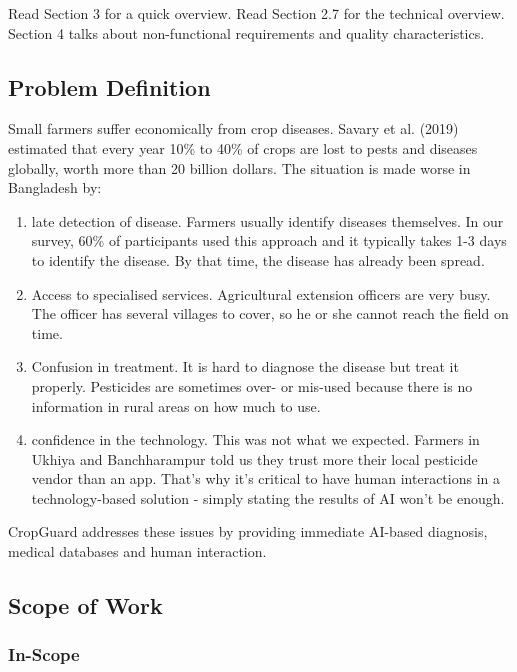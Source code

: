 \documentclass[12pt,a4paper]{article}
\begin{document}
Read Section 3 for a quick overview. Read Section 2.7 for the technical overview. Section 4 talks about non-functional requirements and quality characteristics.

\subsection{Problem Definition}

Small farmers suffer economically from crop diseases. Savary et al. (2019) estimated that every year 10\% to 40\% of crops are lost to pests and diseases globally, worth more than 20 billion dollars. The situation is made worse in Bangladesh by:

\begin{enumerate}[leftmargin=2em]
  \item late detection of disease. Farmers usually identify diseases themselves. In our survey, 60\% of participants used this approach and it typically takes 1-3 days to identify the disease. By that time, the disease has already been spread.

  \item Access to specialised services. Agricultural extension officers are very busy. The officer has several villages to cover, so he or she cannot reach the field on time.

  \item Confusion in treatment. It is hard to diagnose the disease but treat it properly. Pesticides are sometimes over- or mis-used because there is no information in rural areas on how much to use.

  \item confidence in the technology. This was not what we expected. Farmers in Ukhiya and Banchharampur told us they trust more their local pesticide vendor than an app. That's why it's critical to have human interactions in a technology-based solution - simply stating the results of AI won't be enough.
\end{enumerate}

CropGuard addresses these issues by providing immediate AI-based diagnosis, medical databases and human interaction.

\subsection{Scope of Work}

\subsubsection*{In-Scope}
\end{document}
